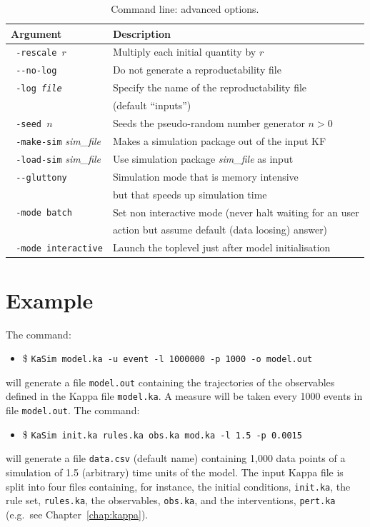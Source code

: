 \documentclass[11pt]{book}
\def\ttt#1{\texttt{#1}}
\def\eg{e.g.~}
\def\ITE#1{\begin{itemize}#1\end{itemize}}
\def\dd{-\hspace{0.001cm}-}
\begin{document}
\begin{table}[h!]
\caption{Command line: advanced options.}
\centering
\begin{tabular}{|l|l|}
\hline
Argument & Description \\ \hline
\ttt{ -rescale $r$} & Multiply each initial quantity by $r$ \\
\ttt{ \dd no-log} & Do not generate a reproductability file \\
\ttt{ -log \textit{file}} & Specify the name of the reproductability file \\
& (default ``inputs'') \\
\ttt{ -seed $n$} & Seeds the pseudo-random number generator $n>0$ \\
\ttt{ -make-sim} \textit{sim\_file} & Makes a simulation package out of the input KF\index{Kappa file} \\
\ttt{ -load-sim} \textit{sim\_file} & Use simulation package \textit{sim\_file} as input\\
\ttt{ \dd gluttony} & Simulation mode that is memory intensive \\ & but that speeds up simulation time\\
\ttt{ -mode batch} & Set non interactive mode (never halt waiting for an user\\
& action but assume default (data loosing) answer)\\
\ttt{ -mode interactive} & Launch the toplevel just after model initialisation\\
\hline
\end{tabular}
\label{tab:add-options}
\end{table}%
%

\section{Example}
The command:
\ITE{
\item[\$] \ttt{KaSim model.ka -u event -l 1000000 -p 1000 -o model.out}
}
will generate a file \ttt{model.out} containing the trajectories of the observables defined in the Kappa file \ttt{model.ka}. A measure will be taken every 1000 events in file \ttt{model.out}. The command:
\ITE{
\item[\$] \ttt{KaSim init.ka rules.ka obs.ka mod.ka -l 1.5 -p 0.0015}
}
will generate a file \ttt{data.csv} (default name) containing 1,000 data points of a simulation of 1.5 (arbitrary) time units of the model. The input Kappa file is split into four files containing, for instance, the initial conditions, \ttt{init.ka}, the rule set, \ttt{rules.ka}, the observables, \ttt{obs.ka}, and the interventions, \ttt{pert.ka} ({\eg}see Chapter~\ref{chap:kappa}). %
\end{document}
